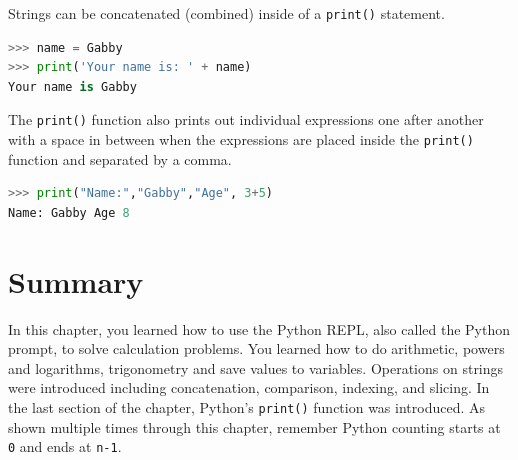 \documentclass{book}
\begin{document}
    
        Strings can be concatenated (combined) inside of a \lstinline!print()!
statement.

\begin{lstlisting}[language=Python]
>>> name = Gabby
>>> print('Your name is: ' + name)
Your name is Gabby
\end{lstlisting}
    




    
        The \lstinline!print()! function also prints out individual expressions
one after another with a space in between when the expressions are
placed inside the \lstinline!print()! function and separated by a comma.

\begin{lstlisting}[language=Python]
>>> print("Name:","Gabby","Age", 3+5)
Name: Gabby Age 8
\end{lstlisting}
    




    
        \newpage
        \section{Summary}\label{summary}

    




    
        In this chapter, you learned how to use the Python REPL, also called the
Python prompt, to solve calculation problems. You learned how to do
arithmetic, powers and logarithms, trigonometry and save values to
variables. Operations on strings were introduced including
concatenation, comparison, indexing, and slicing. In the last section of
the chapter, Python's \lstinline!print()! function was introduced. As
shown multiple times through this chapter, remember Python counting
starts at \lstinline!0! and ends at \lstinline!n-1!.
    
\end{document}
